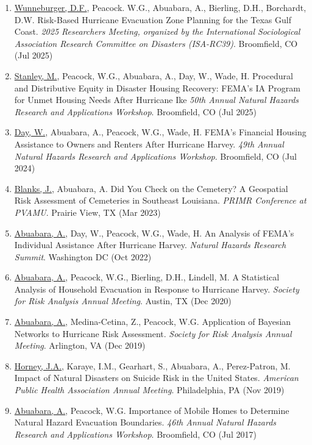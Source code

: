 \documentclass[11pt,oneside]{article}
\begin{document}
\begin{enumerate}[leftmargin=40pt]
\item \underline{Wunneburger, D.F.}, Peacock. W.G., Abuabara, A., Bierling, D.H., Borchardt, D.W. Risk-Based Hurricane Evacuation Zone Planning for the Texas Gulf Coast. \emph{2025 Researchers Meeting, organized by the International Sociological Association Research Committee on Disasters (ISA-RC39)}. Broomfield, CO (Jul 2025)
\item \underline{Stanley, M.}, Peacock, W.G., Abuabara, A., Day, W., Wade, H. Procedural and Distributive Equity in Disaster Housing Recovery: FEMA's IA Program for Unmet Housing Needs After Hurricane Ike \emph{50th Annual Natural Hazards Research and Applications Workshop}. Broomfield, CO (Jul 2025)
\item \underline{Day, W.}, Abuabara, A., Peacock, W.G., Wade, H. FEMA's Financial Housing Assistance to Owners and Renters After Hurricane Harvey. \emph{49th Annual Natural Hazards Research and Applications Workshop}. Broomfield, CO (Jul 2024)
\item \underline{Blanks, J.}, Abuabara, A. Did You Check on the Cemetery? A Geospatial Risk Assessment of Cemeteries in Southeast Louisiana. \emph{PRIMR Conference at PVAMU}. Prairie View, TX (Mar 2023)
\item \underline{Abuabara, A.}, Day, W., Peacock, W.G., Wade, H. An Analysis of FEMA's Individual Assistance After Hurricane Harvey. \emph{Natural Hazards Research Summit}. Washington DC (Oct 2022)
\item \underline{Abuabara, A.}, Peacock, W.G., Bierling, D.H., Lindell, M. A Statistical Analysis of Household Evacuation in Response to Hurricane Harvey. \emph{Society for Risk Analysis Annual Meeting}. Austin, TX (Dec 2020)
\item \underline{Abuabara, A.}, Medina-Cetina, Z., Peacock, W.G. Application of Bayesian Networks to Hurricane Risk Assessment. \emph{Society for Risk Analysis Annual Meeting}. Arlington, VA (Dec 2019)
\item \underline{Horney, J.A.}, Karaye, I.M., Gearhart, S., Abuabara, A., Perez-Patron, M. Impact of Natural Disasters on Suicide Risk in the United States. \emph{American Public Health Association Annual Meeting}. Philadelphia, PA (Nov 2019)
\item \underline{Abuabara, A.}, Peacock, W.G. Importance of Mobile Homes to Determine Natural Hazard Evacuation Boundaries. \emph{46th Annual Natural Hazards Research and Applications Workshop}. Broomfield, CO (Jul 2017)

\end{enumerate}
\end{document}
